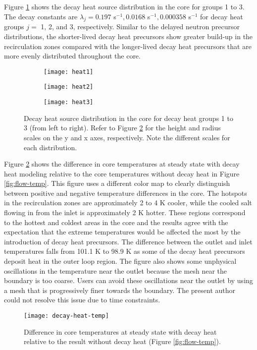 Figure \ref{fig:decayheat} shows the decay heat source distribution in the
core for groups 1 to 3. The decay constants are $\lambda_j = 0.197$ s$^{-1},
0.0168$ s$^{-1}, 0.000358$ s$^{-1}$ for decay heat groups $j=$ 1, 2, and 3,
respectively.
Similar to the delayed neutron precursor distributions, the shorter-lived
decay heat precursors show greater build-up in the recirculation zones
compared with the longer-lived decay heat precursors that are more evenly
distributed throughout the core.

\begin{figure}[htbp!]
    \centering
    \begin{subfigure}[t]{.325\textwidth}
        \centering
        \texttt{[image: heat1]}
    \end{subfigure}
    \begin{subfigure}[t]{.325\textwidth}
        \centering
        \texttt{[image: heat2]}
    \end{subfigure}
    \begin{subfigure}[t]{.325\textwidth}
        \centering
        \texttt{[image: heat3]}
    \end{subfigure}
    \caption{Decay heat source distribution in the core for decay heat groups
    1 to 3 (from left to right). Refer to Figure \ref{fig:decayheattemp} for
    the height and radius scales on the y and x axes, respectively. Note the
    different scales for each distribution.}
    \label{fig:decayheat}
\end{figure}

Figure \ref{fig:decayheattemp} shows the
difference in core temperatures at steady state with decay heat modeling
relative to the core temperatures without decay heat in Figure
\ref{fig:flow-temp}. This figure uses a different color map to clearly
distinguish between positive and negative temperature differences in the core.
The hotspots in the recirculation zones are approximately
2 to 4 K cooler, while the cooled salt flowing in from the inlet is
approximately 2 K hotter. These regions correspond to the hottest and coldest
areas in the core and the results agree with the expectation that the extreme
temperatures would be affected the most by the introduction of decay heat
precursors. The difference between the outlet and inlet temperatures falls
from 101.1 K to 98.9 K as some of the decay heat precursors deposit heat in
the outer loop region. The figure also shows some unphysical oscillations in
the temperature near the outlet because the mesh near the boundary is too
coarse. Users can avoid these oscillations near the outlet by using a mesh
that is progressively finer towards the boundary. The
present author could not resolve this issue due to time constraints.

\begin{figure}[htbp!]
    \centering
    \texttt{[image: decay-heat-temp]}
    \caption{Difference in core temperatures at steady state with decay heat
    relative to the result without decay heat (Figure \ref{fig:flow-temp}).}
    \label{fig:decayheattemp}
\end{figure}
